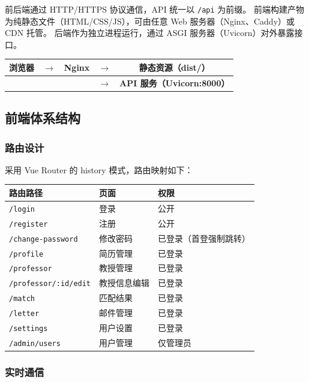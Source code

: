 \documentclass[11pt]{article}
\begin{document}
前后端通过 HTTP/HTTPS 协议通信，API 统一以 \texttt{/api} 为前缀。
前端构建产物为纯静态文件（HTML/CSS/JS），可由任意 Web 服务器（Nginx、Caddy）或 CDN 托管。
后端作为独立进程运行，通过 ASGI 服务器（Uvicorn）对外暴露接口。

\begin{center}
\begin{tabular}{ccccc}
\toprule
\textbf{浏览器} & $\rightarrow$ & \textbf{Nginx} & $\rightarrow$ & \textbf{静态资源（dist/）} \\
\midrule
& & & $\rightarrow$ & \textbf{API 服务（Uvicorn:8000）} \\
\bottomrule
\end{tabular}
\end{center}

\subsection{前端体系结构}

\subsubsection{路由设计}

采用 Vue Router 的 history 模式，路由映射如下：

\begin{center}
\begin{tabular}{lll}
\toprule
\textbf{路由路径} & \textbf{页面} & \textbf{权限} \\
\midrule
\texttt{/login} & 登录 & 公开 \\
\texttt{/register} & 注册 & 公开 \\
\texttt{/change-password} & 修改密码 & 已登录（首登强制跳转） \\
\texttt{/profile} & 简历管理 & 已登录 \\
\texttt{/professor} & 教授管理 & 已登录 \\
\texttt{/professor/:id/edit} & 教授信息编辑 & 已登录 \\
\texttt{/match} & 匹配结果 & 已登录 \\
\texttt{/letter} & 邮件管理 & 已登录 \\
\texttt{/settings} & 用户设置 & 已登录 \\
\texttt{/admin/users} & 用户管理 & 仅管理员 \\
\bottomrule
\end{tabular}
\end{center}

\subsubsection{实时通信}
\end{document}
